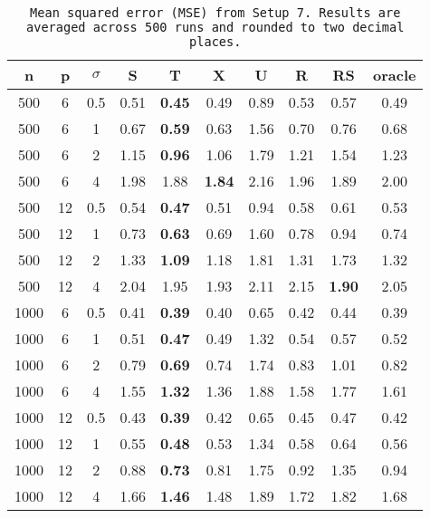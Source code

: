 \begin{table}[ht]
\centering
\begin{tabular}{cccccccccc}
  \hline
n & p & $\sigma$ & S & T & X & U & R & RS & oracle \\ 
  \hline
500 & 6 & 0.5 & 0.51 & \bf 0.45 & 0.49 &  0.89 & 0.53 & 0.57 & 0.49 \\ 
  500 & 6 & 1 & 0.67 & \bf 0.59 & 0.63 &  1.56 & 0.70 & 0.76 & 0.68 \\ 
  500 & 6 & 2 & 1.15 & \bf 0.96 & 1.06 &  1.79 & 1.21 & 1.54 & 1.23 \\ 
  500 & 6 & 4 & 1.98 & 1.88 & \bf 1.84 &  2.16 & 1.96 & 1.89 & 2.00 \\ 
  500 & 12 & 0.5 & 0.54 & \bf 0.47 & 0.51 &  0.94 & 0.58 & 0.61 & 0.53 \\ 
  500 & 12 & 1 & 0.73 & \bf 0.63 & 0.69 &  1.60 & 0.78 & 0.94 & 0.74 \\ 
  500 & 12 & 2 & 1.33 & \bf 1.09 & 1.18 &  1.81 & 1.31 & 1.73 & 1.32 \\ 
  500 & 12 & 4 & 2.04 & 1.95 & 1.93 &  2.11 & 2.15 & \bf 1.90 & 2.05 \\ 
  1000 & 6 & 0.5 & 0.41 & \bf 0.39 & 0.40 &  0.65 & 0.42 & 0.44 & 0.39 \\ 
  1000 & 6 & 1 & 0.51 & \bf 0.47 & 0.49 &  1.32 & 0.54 & 0.57 & 0.52 \\ 
  1000 & 6 & 2 & 0.79 & \bf 0.69 & 0.74 &  1.74 & 0.83 & 1.01 & 0.82 \\ 
  1000 & 6 & 4 & 1.55 & \bf 1.32 & 1.36 &  1.88 & 1.58 & 1.77 & 1.61 \\ 
  1000 & 12 & 0.5 & 0.43 & \bf 0.39 & 0.42 &  0.65 & 0.45 & 0.47 & 0.42 \\ 
  1000 & 12 & 1 & 0.55 & \bf 0.48 & 0.53 &  1.34 & 0.58 & 0.64 & 0.56 \\ 
  1000 & 12 & 2 & 0.88 & \bf 0.73 & 0.81 &  1.75 & 0.92 & 1.35 & 0.94 \\ 
  1000 & 12 & 4 & 1.66 & \bf 1.46 & 1.48 &  1.89 & 1.72 & 1.82 & 1.68 \\ 
   \hline
\end{tabular}
\caption{\tt Mean squared error (MSE) from Setup 7. Results are averaged across 500 runs and rounded to two decimal places.} 
\label{table:setup7}
\end{table}
